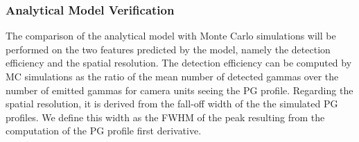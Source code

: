 \documentclass[a4paper,english,12pt]{article}
\newcommand{\mr}[2]{\multirow{#1}{*}{#2}}
\begin{document}




\subsubsection{Analytical Model Verification}

The comparison of the analytical model with Monte Carlo simulations will be performed on the two features predicted by the model, namely the detection efficiency and the spatial resolution. The detection efficiency can be computed by MC simulations as the ratio of the mean number of detected gammas over the number of emitted gammas for camera units seeing the PG profile. Regarding the spatial resolution, it is derived from the fall-off width of the the simulated PG profiles. We define this width as the FWHM of the peak resulting from the computation of the PG profile first derivative. 
\end{document}
